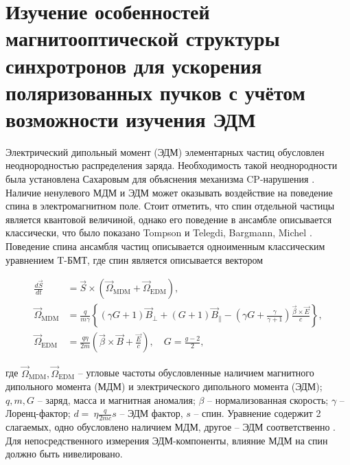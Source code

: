 
	\chapter{Изучение особенностей магнитооптической структуры синхротронов для ускорения поляризованных пучков с учётом возможности изучения ЭДМ}\label{ch:EDM}

\par Электрический дипольный момент (ЭДМ) элементарных частиц обусловлен неоднородностью распределения заряда. Необходимость такой неоднородности была установлена Сахаровым для объяснения механизма CP-нарушения \cite{sakharov}. Наличие ненулевого МДМ и ЭДМ может оказывать воздействие на поведение спина в электромагнитном поле.  Стоит отметить, что спин отдельной частицы является квантовой величиной, однако его поведение в ансамбле описывается классически, что было показано Tompson и Telegdi, Bargmann, Michel \cite{TBMT}. Поведение спина ансамбля частиц описывается одноименным классическим уравнением T-БМТ, где спин является описывается вектором

\begin{align} \label{eq:T-BMT}
\frac{{d \vec{S}}}{d t} &=\vec{S} \times\left(\vec{\Omega}_{\textrm{MDM}}+\vec{\Omega}_{\textrm{EDM}}\right), \nonumber\\
\vec{\Omega}_{\textrm{MDM}}&=\frac{q}{m \gamma}\left\{(\gamma G+1)\vec{B}_{\perp}+(G+1)\vec{B}_{\parallel}-\left(\gamma G+\frac{\gamma}{\gamma+1}\right) \frac{\vec{\beta} \times \vec{E}}{c}\right\}, \\
\vec{\Omega}_{\textrm{EDM}}&=\frac{q \eta}{2 m}\left(\vec{\beta} \times \vec{B}+\frac{\vec{E}}{c}\right), \quad G=\frac{g-2}{2},\nonumber
\end{align}

\noindent где $\vec{\Omega}_{\textrm{MDM}}, \vec{\Omega}_{\textrm{EDM}}$ -- угловые частоты обусловленные наличием магнитного дипольного момента (МДМ) и электрического дипольного момента (ЭДМ); $q, m, G$ -- заряд, масса и магнитная аномалия; $\beta$ -- нормализованная скорость; $\gamma$ -- Лоренц-фактор; $d =~\eta \frac{q}{2mc}s$ -- ЭДМ фактор, $s$ -- спин. Уравнение содержит 2 слагаемых, одно обусловлено наличием МДМ, другое – ЭДМ соответственно \cite{silenko:edm}. Для непосредственного измерения ЭДМ-компоненты, влияние МДМ на спин должно быть нивелировано.

